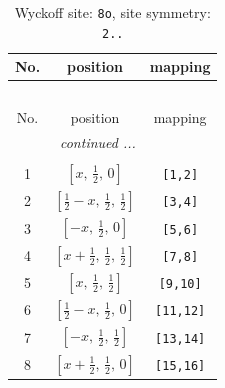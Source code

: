 \documentclass[fleqn,8pt]{jsarticle}
\begin{document}
\begin{longtable}{ccc}
\caption{Wyckoff site: {\tt 8o}, site symmetry: {\tt 2..}}
 \\
 \hline \hline
No. & position & mapping \\ \hline \endfirsthead

\multicolumn{2}{l}{\tablename\ \thetable{}} \\
 \hline \hline
No. & position & mapping \\ \hline \endhead

 \hline \hline
\multicolumn{2}{r}{\footnotesize\it continued ...} \\ \endfoot

 \hline \hline
\multicolumn{2}{r}{} \\ \endlastfoot

1 & $\left[ x,\, \frac{1}{2},\, 0 \right]$ & {\tt [1,2]} \\ \hline
2 & $\left[ \frac{1}{2} - x,\, \frac{1}{2},\, \frac{1}{2} \right]$ & {\tt [3,4]} \\ \hline
3 & $\left[ - x,\, \frac{1}{2},\, 0 \right]$ & {\tt [5,6]} \\ \hline
4 & $\left[ x + \frac{1}{2},\, \frac{1}{2},\, \frac{1}{2} \right]$ & {\tt [7,8]} \\ \hline
5 & $\left[ x,\, \frac{1}{2},\, \frac{1}{2} \right]$ & {\tt [9,10]} \\ \hline
6 & $\left[ \frac{1}{2} - x,\, \frac{1}{2},\, 0 \right]$ & {\tt [11,12]} \\ \hline
7 & $\left[ - x,\, \frac{1}{2},\, \frac{1}{2} \right]$ & {\tt [13,14]} \\ \hline
8 & $\left[ x + \frac{1}{2},\, \frac{1}{2},\, 0 \right]$ & {\tt [15,16]} \\
\end{longtable}
\renewcommand{\arraystretch}{1.2}
\end{document}
